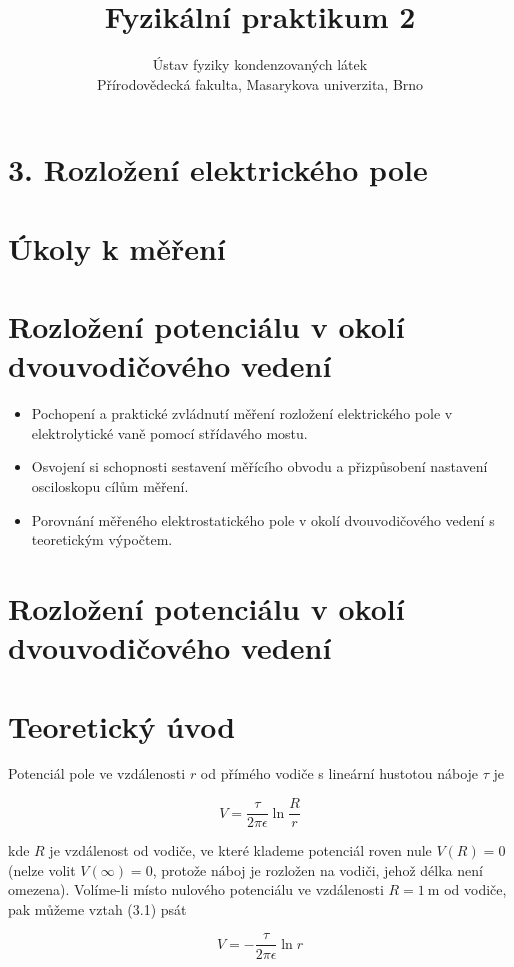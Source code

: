 \documentclass[10pt]{article}
\title{Fyzikální praktikum 2 }
\author{Ústav fyziky kondenzovaných látek\\
Přírodovědecká fakulta, Masarykova univerzita, Brno}
\date{}
\begin{document}
\maketitle


\section*{3. Rozložení elektrického pole}
\section*{Úkoly k měření}
\section*{Rozložení potenciálu v okolí dvouvodičového vedení}
\begin{itemize}
  \item Pochopení a praktické zvládnutí měření rozložení elektrického pole v elektrolytické vaně pomocí střídavého mostu.
  \item Osvojení si schopnosti sestavení měřícího obvodu a přizpůsobení nastavení osciloskopu cílům měření.
  \item Porovnání měřeného elektrostatického pole v okolí dvouvodičového vedení s teoretickým výpočtem.
\end{itemize}

\section*{Rozložení potenciálu v okolí dvouvodičového vedení}
\section*{Teoretický úvod}
Potenciál pole ve vzdálenosti $r$ od přímého vodiče s lineární hustotou náboje $\tau$ je


\begin{equation*}
V=\frac{\tau}{2 \pi \epsilon} \ln \frac{R}{r} \tag{3.1}
\end{equation*}


kde $R$ je vzdálenost od vodiče, ve které klademe potenciál roven nule $V(R)=0$ (nelze volit $V(\infty)=0$, protože náboj je rozložen na vodiči, jehož délka není omezena). Volíme-li místo nulového potenciálu ve vzdálenosti $R=1 \mathrm{~m}$ od vodiče, pak můžeme vztah (3.1) psát


\begin{equation*}
V=-\frac{\tau}{2 \pi \epsilon} \ln r \tag{3.2}
\end{equation*}
\end{document}
